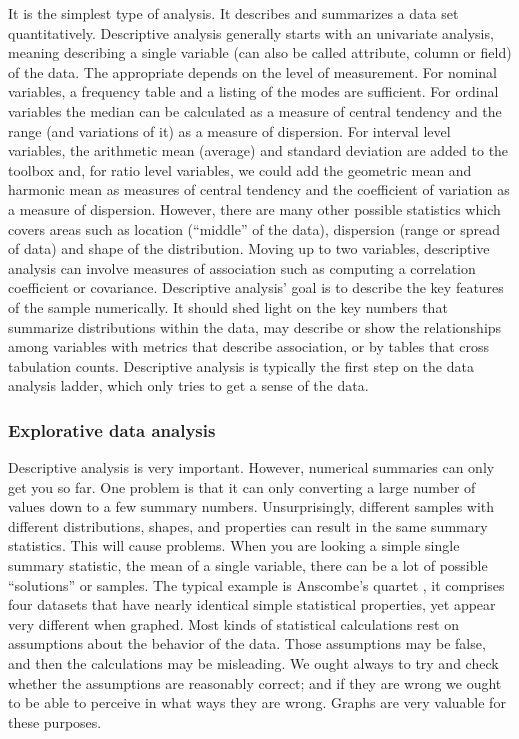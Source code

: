 \documentclass[
]{book}
\begin{document}
It is the simplest type of analysis. It describes and summarizes a data set quantitatively. Descriptive analysis generally starts with an univariate analysis, meaning describing a single variable (can also be called attribute, column or field) of the data. The appropriate depends on the level of measurement. For nominal variables, a frequency table and a listing of the modes are sufficient. For ordinal variables the median can be calculated as a measure of central tendency and the range (and variations of it) as a measure of dispersion. For interval level variables, the arithmetic mean (average) and standard deviation are added to the toolbox and, for ratio level variables, we could add the geometric mean and harmonic mean as measures of central tendency and the coefficient of variation as a measure of dispersion. However, there are many other possible statistics which covers areas such as location (``middle'' of the data), dispersion (range or spread of data) and shape of the distribution. Moving up to two variables, descriptive analysis can involve measures of association such as computing a correlation coefficient or covariance. Descriptive analysis' goal is to describe the key features of the sample numerically. It should shed light on the key numbers that summarize distributions within the data, may describe or show the relationships among variables with metrics that describe association, or by tables that cross tabulation counts. Descriptive analysis is typically the first step on the data analysis ladder, which only tries to get a sense of the data.

\hypertarget{explorative-data-analysis}{%
\subsubsection*{\texorpdfstring{\textbf{Explorative data analysis}}{Explorative data analysis}}\label{explorative-data-analysis}}


Descriptive analysis is very important. However, numerical summaries can only get you so far. One problem is that it can only converting a large number of values down to a few summary numbers. Unsurprisingly, different samples with different distributions, shapes, and properties can result in the same summary statistics. This will cause problems. When you are looking a simple single summary statistic, the mean of a single variable, there can be a lot of possible ``solutions'' or samples. The typical example is Anscombe's quartet \citep{Anscombe1973}, it comprises four datasets that have nearly identical simple statistical properties, yet appear very different when graphed. Most kinds of statistical calculations rest on assumptions about the behavior of the data. Those assumptions may be false, and then the calculations may be misleading. We ought always to try and check whether the assumptions are reasonably correct; and if they are wrong we ought to be able to perceive in what ways they are wrong. Graphs are very valuable for these purposes.
\end{document}
